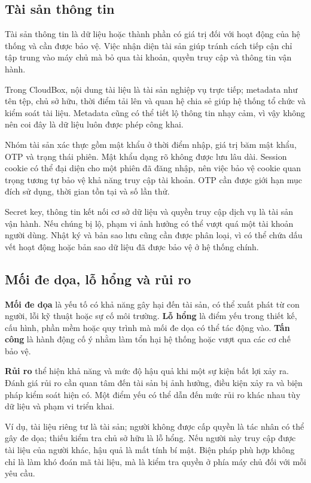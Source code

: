 \subsection{Tài sản thông tin}
Tài sản thông tin là dữ liệu hoặc thành phần có giá trị đối với hoạt động của hệ thống và cần được bảo vệ. Việc nhận diện tài sản giúp tránh cách tiếp cận chỉ tập trung vào máy chủ mà bỏ qua tài khoản, quyền truy cập và thông tin vận hành.

Trong CloudBox, nội dung tài liệu là tài sản nghiệp vụ trực tiếp; metadata như tên tệp, chủ sở hữu, thời điểm tải lên và quan hệ chia sẻ giúp hệ thống tổ chức và kiểm soát tài liệu. Metadata cũng có thể tiết lộ thông tin nhạy cảm, vì vậy không nên coi đây là dữ liệu luôn được phép công khai.

Nhóm tài sản xác thực gồm mật khẩu ở thời điểm nhập, giá trị băm mật khẩu, OTP và trạng thái phiên. Mật khẩu dạng rõ không được lưu lâu dài. Session cookie có thể đại diện cho một phiên đã đăng nhập, nên việc bảo vệ cookie quan trọng tương tự bảo vệ khả năng truy cập tài khoản. OTP cần được giới hạn mục đích sử dụng, thời gian tồn tại và số lần thử.

Secret key, thông tin kết nối cơ sở dữ liệu và quyền truy cập dịch vụ là tài sản vận hành. Nếu chúng bị lộ, phạm vi ảnh hưởng có thể vượt quá một tài khoản người dùng. Nhật ký và bản sao lưu cũng cần được phân loại, vì có thể chứa dấu vết hoạt động hoặc bản sao dữ liệu đã được bảo vệ ở hệ thống chính.

\subsection{Mối đe dọa, lỗ hổng và rủi ro}
\textbf{Mối đe dọa} là yếu tố có khả năng gây hại đến tài sản, có thể xuất phát từ con người, lỗi kỹ thuật hoặc sự cố môi trường. \textbf{Lỗ hổng} là điểm yếu trong thiết kế, cấu hình, phần mềm hoặc quy trình mà mối đe dọa có thể tác động vào. \textbf{Tấn công} là hành động cố ý nhằm làm tổn hại hệ thống hoặc vượt qua các cơ chế bảo vệ.

\textbf{Rủi ro} thể hiện khả năng và mức độ hậu quả khi một sự kiện bất lợi xảy ra. Đánh giá rủi ro cần quan tâm đến tài sản bị ảnh hưởng, điều kiện xảy ra và biện pháp kiểm soát hiện có. Một điểm yếu có thể dẫn đến mức rủi ro khác nhau tùy dữ liệu và phạm vi triển khai.

Ví dụ, tài liệu riêng tư là tài sản; người không được cấp quyền là tác nhân có thể gây đe dọa; thiếu kiểm tra chủ sở hữu là lỗ hổng. Nếu người này truy cập được tài liệu của người khác, hậu quả là mất tính bí mật. Biện pháp phù hợp không chỉ là làm khó đoán mã tài liệu, mà là kiểm tra quyền ở phía máy chủ đối với mỗi yêu cầu.


